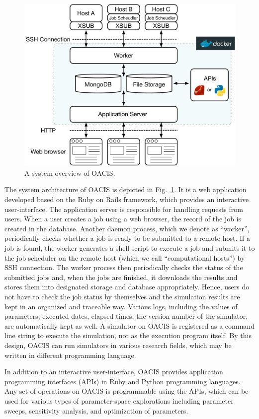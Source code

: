 \begin{figure}
  \centering
  \includegraphics[width=.8\linewidth]{Figs.murase/oacis_overview.pdf}
  \caption{A system overview of OACIS.}
  \label{fig:oacis_overview}
\end{figure}

The system architecture of OACIS is depicted in Fig.~\ref{fig:oacis_overview}.
It is a web application developed based on the Ruby on Rails framework, which provides an interactive user-interface.
The application server is responsible for handling requests from users. When a user creates a job using a web browser, the record of the job is created in the database.
Another daemon process, which we denote as ``worker'', periodically checks whether a job is ready to be submitted to a remote host.
If a job is found, the worker generates a shell script to execute a job and submits it to the job scheduler on the remote host (which we call ``computational hosts'') by SSH connection.
The worker process then periodically checks the status of the submitted jobs and, when the jobs are finished, it downloads the results and stores them into designated storage and database appropriately.
Hence, users do not have to check the job status by themselves and the simulation results are kept in an organized and traceable way.
Various logs, including the values of parameters, executed dates, elapsed times, the version number of the simulator, are automatically kept as well.
A simulator on OACIS is registered as a command line string to execute the simulation, not as the execution program itself.
By this design, OACIS can run simulators in various research fields, which may be written in different programming language.

In addition to an interactive user-interface, OACIS provides application programming interfaces (APIs) in Ruby and Python programming languages.
Any set of operations on OACIS is programmable using the APIs, which can be used for various types of parameter-space explorations including parameter sweeps, sensitivity analysis, and optimization of parameters.

